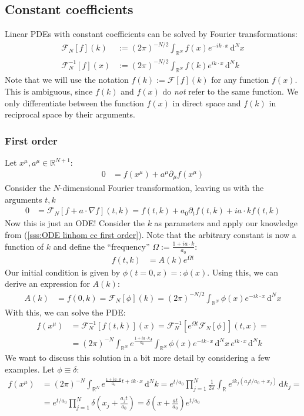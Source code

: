 \documentclass[english, parskip=full]{scrreprt}
\newcommand{\intr}{}
\newcommand{\kla}{}
\newcommand{\klam}{}
\begin{document}
\subsection{Constant coefficients}
Linear PDEs with constant coefficients can be solved by Fourier transformations:
\begin{align*}
\mathcal{F}_N[f](k)&:=(2\pi)^{-N/2}\intr\int_{\mathbb{R}^{N}}{f(x)e^{-ik\cdot x}}\,\mathrm{d}^{N}x \\
\mathcal{F}_N^{-1}[f](x)&:=(2\pi)^{-N/2}\intr\int_{\mathbb{R}^{N}}{f(k)e^{ik\cdot x}}\,\mathrm{d}^{N}k
\end{align*}
Note that we will use the notation $f(k):=\mathcal{F}[f](k)$ for any function $f(x)$. This is ambiguous, since $f(k)$ and $f(x)$ do \textsl{not} refer to the same function. We only differentiate between the function $f(x)$ in direct space and $f(k)$ in reciprocal space by their arguments.
\subsubsection{First order}
Let $x^\mu,a^\mu\in\mathbb{R}^{N+1}$:
\begin{align*}
0&=f(x^\mu) + a^\mu\partial_\mu f(x^\mu)
\end{align*}
Consider the $N$-dimensional Fourier transformation, leaving us with the arguments $t,k$
\begin{align*}
0&=\mathcal{F}_{N}[f+a\cdot\nabla f](t,k)=f(t,k)+a_0\partial_{t}f(t,k) + ia\cdot k  f(t,k)
\end{align*}
Now this is just an ODE! Consider the $k$ as parameters and apply our knowledge from (\ref{sss:ODE linhom cc first order}). Note that the arbitrary constant is now a function of $k$ and define the ``frequency'' $\Omega:=\frac{1+ia\cdot k}{a_0}$:
\begin{align*}
f(t,k)&=A(k)e^{\Omega t}
\end{align*}
Our initial condition is given by $\phi(t=0,x)=:\phi(x)$. Using this, we can derive an expression for $A(k)$:
\begin{align*}
A(k)&=f(0,k)=\mathcal{F}_{N}[\phi](k)=(2\pi)^{-N/2}\intr\int_{\mathbb{R}^{N}}{\phi(x)e^{-ik\cdot x}}\,\mathrm{d}^{N}x
\end{align*}
With this, we can solve the PDE:
\begin{align*}
f(x^\mu)&=\mathcal{F}_{N}^{-1}[f(t,k)](x)=\mathcal{F}_N^{-1}\klam\left[ {e^{\Omega t}\mathcal{F}_N[\phi]} \right](t,x)=\\
&=(2\pi)^{-N}\intr\int_{\mathbb{R}^{N}}{e^{\frac{1+ia\cdot k}{a_0}t}\intr\int_{\mathbb{R}^{N}}{\phi(x)e^{-ik\cdot x}}\,\mathrm{d}^{N}x}\,e^{ik\cdot x}\,\mathrm{d}^{N}k
\end{align*}
We want to discuss this solution in a bit more detail by considering a few examples. Let $\phi\equiv\delta$:
\begin{align*}
f(x^\mu)&=(2\pi)^{-N}\intr\int_{\mathbb{R}^{N}}{e^{\frac{1+ia\cdot k}{a_0}t+ik\cdot x}}\,\mathrm{d}^{N}k=e^{t/a_0}\prod_{j=1}^N\frac{1}{2\pi}\intr\int_{\mathbb{R}^{ }}e^{ik_j(a_jt/a_0 + x_j)}\,\mathrm{d}^{}k_j=\\
&=e^{t/a_0}\prod_{j=1}^N\delta\kla\left( {x_j+\frac{a_jt}{a_0}} \right)=\delta\kla\left( {x+\frac{at}{a_0}} \right)e^{t/a_0}
\end{align*}
\end{document}
